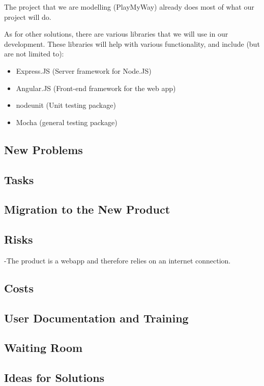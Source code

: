 \documentclass[12pt, titlepage]{article}
\begin{document}
The project that we are modelling (PlayMyWay) already does most of what our
project will do.

As for other solutions, there are various libraries that we will use in our
development. These libraries will help with various functionality, and include
(but are not limited to):
\begin{itemize}
\item Express.JS (Server framework for Node.JS)
\item Angular.JS (Front-end framework for the web app)
\item nodeunit (Unit testing package)
\item Mocha (general testing package)
\end{itemize}
\subsection{New Problems}

\subsection{Tasks}

\subsection{Migration to the New Product}

\subsection{Risks}
-The product is a webapp and therefore relies on an internet connection.
\subsection{Costs}

\subsection{User Documentation and Training}

\subsection{Waiting Room}

\subsection{Ideas for Solutions}
\end{document}
